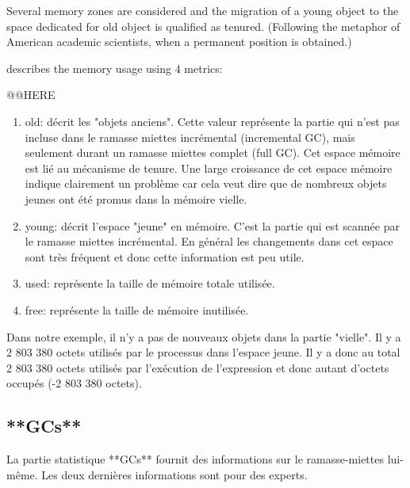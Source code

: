 \documentclass[a4paper,10pt,twoside]{book}
\begin{document}
Several memory zones are considered and the migration of a young object to the space dedicated for old object is qualified as tenured. (Following the metaphor of American academic scientists, when a permanent position is obtained.)

 describes the memory usage using 4 metrics:

@@HERE

\begin{enumerate}
\item old: d\'ecrit les "objets anciens". Cette valeur repr\'esente la
  partie qui n'est pas incluse dans le ramasse miettes incr\'emental
  (incremental GC),  mais seulement durant un ramasse miettes complet
  (full GC). Cet espace m\'emoire est li\'e au m\'ecanisme de tenure. Une large croissance de cet espace m\'emoire indique
  clairement un probl\`eme car cela veut dire que de nombreux objets  jeunes ont \'et\'e promus dans la m\'emoire vielle.

\item young: d\'ecrit l'espace "jeune" en m\'emoire. C'est la partie
  qui est scann\'ee par le  ramasse miettes incr\'emental. En
  g\'en\'eral les changements dans cet espace sont tr\`es fr\'equent
  et donc cette information est peu utile.

\item used: repr\'esente la taille de m\'emoire totale  utilis\'ee.

\item free: repr\'esente la taille de m\'emoire inutilis\'ee.
\end{enumerate}

Dans notre exemple, il n'y a pas de nouveaux objets dans la partie "vielle". Il y a
2 803 380 octets utilis\'es par le processus dans l'espace jeune. Il y a
donc au total 2 803 380 octets utilis\'es par l'ex\'ecution de
l'expression et donc autant d'octets occup\'es (-2 803 380 octets).

\subsection{**GCs**}

La partie statistique **GCs** fournit des informations sur le
ramasse-miettes lui-m\^eme. Les deux derni\`eres informations sont
pour des experts. 
\end{document}
